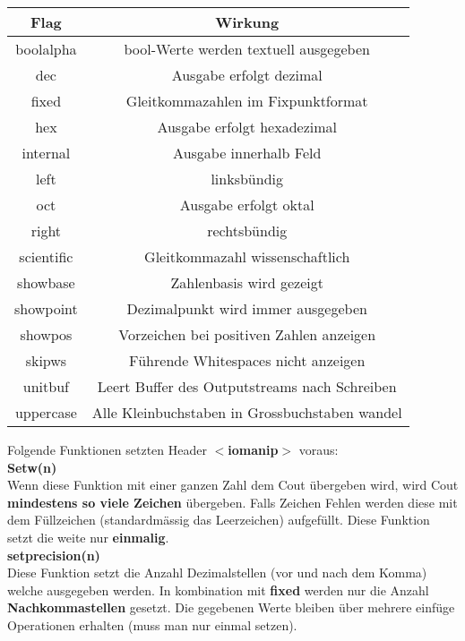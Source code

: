 \begin{center}
    \begin{tabular}{cc}
        \rowcolor[RGB]{239,239,239} 
        \textbf{Flag} & \textbf{Wirkung}                                        \\ \hline
        boolalpha     & bool-Werte werden textuell ausgegeben                   \\
        dec           & Ausgabe erfolgt dezimal                                 \\
        fixed         & Gleitkommazahlen im Fixpunktformat                      \\
        hex           & Ausgabe erfolgt hexadezimal                             \\
        internal      & Ausgabe innerhalb Feld                                  \\
        left          & linksbündig                                             \\
        oct           & Ausgabe erfolgt oktal                                   \\
        right         & rechtsbündig                                            \\
        scientific    & Gleitkommazahl wissenschaftlich                         \\
        showbase      & Zahlenbasis wird gezeigt                                \\
        showpoint     & Dezimalpunkt wird immer ausgegeben                      \\
        showpos       & Vorzeichen bei positiven Zahlen anzeigen                \\
        skipws        & Führende Whitespaces nicht anzeigen                     \\
        unitbuf       & Leert Buffer des Outputstreams nach Schreiben           \\
        uppercase     & Alle Kleinbuchstaben in Grossbuchstaben wandel
    \end{tabular}
\end{center}

Folgende Funktionen setzten Header \textbf{$<$iomanip$>$} voraus:\\

\textbf{Setw(n)}\\

Wenn diese Funktion mit einer ganzen Zahl dem Cout übergeben wird, wird Cout \textbf{mindestens so viele Zeichen} übergeben. 
Falls Zeichen Fehlen werden diese mit dem Füllzeichen (standardmässig das Leerzeichen) aufgefüllt. 
Diese Funktion setzt die weite nur \textbf{einmalig}.\\

\textbf{setprecision(n)}\\

Diese Funktion setzt die Anzahl Dezimalstellen (vor und nach dem Komma) welche ausgegeben werden. 
In kombination mit \textbf{fixed} werden nur die Anzahl \textbf{Nachkommastellen} gesetzt. 
Die gegebenen Werte bleiben über mehrere einfüge Operationen erhalten (muss man nur einmal setzen). 





